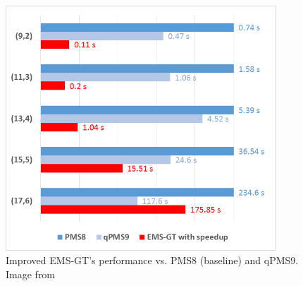 
\begin{figure}[ht]\label{fig:results2}
	\centering
	\includegraphics[width=4.0in]{contents/00_images/emsgt-with-speedup-vs-PMS,qPMS9}
	\caption{Improved EMS-GT's performance vs. PMS8 (baseline) and qPMS9. Image from \cite{sia2015}}
	\label{fig:sia-bar-results}
\end{figure}